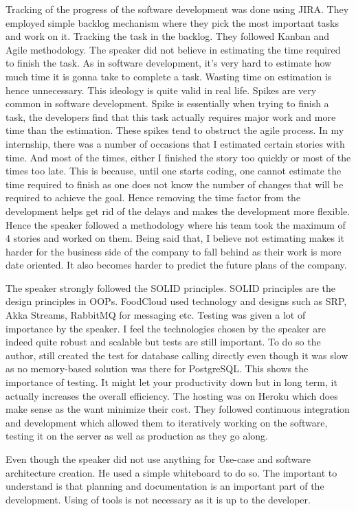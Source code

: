 Tracking of the progress of the software development was done using JIRA. They employed simple backlog mechanism where they pick the most important tasks and work on it. Tracking the task in the backlog. They followed Kanban and Agile methodology. The speaker did not believe in estimating the time required to finish the task. As in software development, it's very hard to estimate how much time it is gonna take to complete a task. Wasting time on estimation is hence unnecessary. This ideology is quite valid in real life. Spikes are very common in software development. Spike is essentially when trying to finish a task, the developers find that this task actually requires major work and more time than the estimation. These spikes tend to obstruct the agile process. In my internship, there was a number of occasions that I estimated certain stories with time. And most of the times, either I finished the story too quickly or most of the times too late. This is because, until one starts coding, one cannot estimate the time required to finish as one does not know the number of changes that will be required to achieve the goal. Hence removing the time factor from the development helps get rid of the delays and makes the development more flexible. Hence the speaker followed a methodology where his team took the maximum of 4 stories and worked on them. Being said that, I believe not estimating makes it harder for the business side of the company to fall behind as their work is more date oriented. It also becomes harder to predict the future plans of the company.

The speaker strongly followed the SOLID principles. SOLID principles are the design principles in OOPs. FoodCloud used technology and designs such as SRP, Akka Streams, RabbitMQ for messaging etc. Testing was given a lot of importance by the speaker. I feel the technologies chosen by the speaker are indeed quite robust and scalable but tests are still important. To do so the author, still created the test for database calling directly even though it was slow as no memory-based solution was there for PostgreSQL. This shows the importance of testing. It might let your productivity down but in long term, it actually increases the overall efficiency. The hosting was on Heroku which does make sense as the want minimize their cost. They followed continuous integration and development which allowed them to iteratively working on the software, testing it on the server as well as production as they go along. 

Even though the speaker did not use anything for Use-case and software architecture creation. He used a simple whiteboard to do so. The important to understand is that planning and documentation is an important part of the development. Using of tools is not necessary as it is up to the developer.

